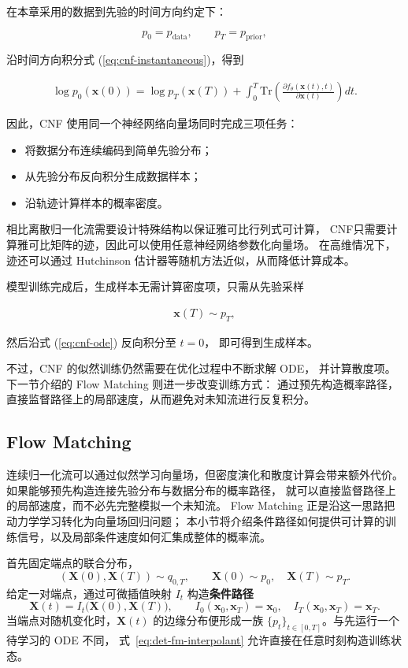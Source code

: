 在本章采用的数据到先验的时间方向约定下：

\[
p_0=p_{\mathrm{data}},
\qquad
p_T=p_{\mathrm{prior}},
\]

沿时间方向积分式
(\ref{eq:cnf-instantaneous})，得到

\begin{eqnarray}
\log p_0(\mathbf{x}(0))
=
\log p_T(\mathbf{x}(T))
+
\int_0^T
\mathrm{Tr}
\left(
\frac{\partial f_{\theta}(\mathbf{x}(t),t)}
{\partial\mathbf{x}(t)}
\right)
dt .
\label{eq:cnf-likelihood}
\end{eqnarray}

因此，CNF 使用同一个神经网络向量场同时完成三项任务：

\begin{itemize}
\item 将数据分布连续编码到简单先验分布；
\item 从先验分布反向积分生成数据样本；
\item 沿轨迹计算样本的概率密度。
\end{itemize}

相比离散归一化流需要设计特殊结构以保证雅可比行列式可计算，
CNF只需要计算雅可比矩阵的迹，因此可以使用任意神经网络参数化向量场。
在高维情况下，迹还可以通过 Hutchinson 估计器等随机方法近似，从而降低计算成本。

模型训练完成后，生成样本无需计算密度项，只需从先验采样

\begin{eqnarray}
\mathbf{x}(T)\sim p_T,
\end{eqnarray}

然后沿式 (\ref{eq:cnf-ode}) 反向积分至 $t=0$，
即可得到生成样本。

不过，CNF 的似然训练仍然需要在优化过程中不断求解 ODE，
并计算散度项。下一节介绍的 Flow Matching 则进一步改变训练方式：
通过预先构造概率路径，直接监督路径上的局部速度，从而避免对未知流进行反复积分。


\subsection{Flow Matching}

连续归一化流可以通过似然学习向量场，但密度演化和散度计算会带来额外代价。
如果能够预先构造连接先验分布与数据分布的概率路径，
就可以直接监督路径上的局部速度，而不必先完整模拟一个未知流。
Flow Matching 正是沿这一思路把动力学学习转化为向量场回归问题；
本小节将介绍条件路径如何提供可计算的训练信号，以及局部条件速度如何汇集成整体的概率流。

首先固定端点的联合分布，
\[
    (\mathbf{X}(0),\mathbf{X}(T))
    \sim q_{0,T},
    \qquad
    \mathbf{X}(0)\sim p_0,
    \quad
    \mathbf{X}(T)\sim p_T.
\]
给定一对端点，通过可微插值映射
\(I_t\) 构造\textbf{条件路径}
\begin{equation}
    \mathbf{X}(t)
    =
    I_t\bigl(\mathbf{X}(0),\mathbf{X}(T)\bigr),
    \qquad
    I_0(\mathbf{x}_0,\mathbf{x}_T)=\mathbf{x}_0,
    \quad
    I_T(\mathbf{x}_0,\mathbf{x}_T)=\mathbf{x}_T.
    \label{eq:det-fm-interpolant}
\end{equation}
当端点对随机变化时，\(\mathbf{X}(t)\) 的边缘分布便形成一族
\(\{p_t\}_{t\in[0,T]}\)。与先运行一个待学习的 ODE 不同，
式~\eqref{eq:det-fm-interpolant} 允许直接在任意时刻构造训练状态。


